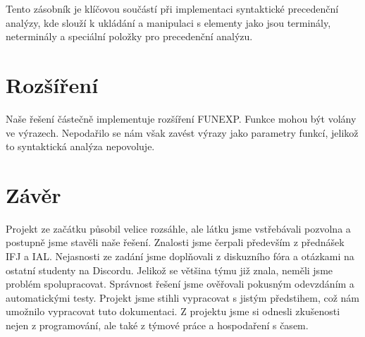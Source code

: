 \documentclass[a4paper, 12pt]{article}
\begin{document}
Tento zásobník je klíčovou součástí při implementaci syntaktické precedenční analýzy, kde slouží k ukládání a manipulaci s elementy jako jsou terminály, neterminály a speciální položky pro precedenční analýzu.


\newpage
{}
\section{Rozšíření}
Naše řešení částečně implementuje rozšíření FUNEXP.\newline
Funkce mohou být volány ve výrazech. Nepodařilo se nám však zavést výrazy jako parametry funkcí, jelikož to syntaktická analýza nepovoluje.

\section{Závěr}
Projekt ze začátku působil velice rozsáhle, ale látku jsme vstřebávali pozvolna a postupně jsme stavěli naše řešení. Znalosti jsme čerpali především z přednášek IFJ a IAL. Nejasnosti ze zadání jsme doplňovali z diskuzního fóra a otázkami na ostatní studenty na Discordu. Jelikož se většina týmu již znala, neměli jsme problém spolupracovat. Správnost řešení jsme ověřovali pokusným odevzdáním a automatickými testy. Projekt jsme stihli vypracovat s jistým předstihem, což nám umožnilo vypracovat tuto dokumentaci. Z projektu jsme si odnesli zkušenosti nejen z programování, ale také z týmové práce a hospodaření s časem.
\end{document}
